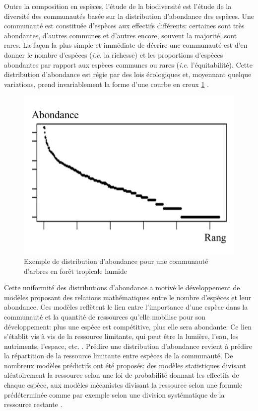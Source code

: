 \documentclass[
  11pt,
  french,
  A4paper,
  extrafontsizes,onecolumn,openright
  ]{memoir}
\begin{document}
Outre la composition en espèces, l'étude de la biodiversité est l'étude
de la diversité des communautés basée sur la distribution d'abondance
des espèces. Une communauté est constituée d'espèces aux effectifs
différents: certaines sont très abondantes, d'autres communes et
d'autres encore, souvent la majorité, sont rares. La façon la plus
simple et immédiate de décrire une communauté est d'en donner le nombre
d'espèces (\emph{i.e.} la richesse) et les proportions d'espèces
abondantes par rapport aux espèces communes ou rares (\emph{i.e.}
l'équitabilité). Cette distribution d'abondance est régie par des lois
écologiques et, moyennant quelque variations, prend invariablement la
forme d'une courbe en creux \ref{fig:AbdDist} \autocite{McGill2007}.

\begin{figure}

{\centering \includegraphics[width=0.6\linewidth]{ExternalFig/SpeciesAbdDist} 

}

\caption{Exemple de distribution d'abondance pour une communauté d'arbres en forêt tropicale humide}\label{fig:AbdDist}
\end{figure}

Cette uniformité des distributions d'abondance a motivé le développement
de modèles proposant des relations mathématiques entre le nombre
d'espèces et leur abondance. Ces modèles reflètent le lien entre
l'importance d'une espèce dans la communauté et la quantité de
ressources qu'elle mobilise pour son développement: plus une espèce est
compétitive, plus elle sera abondante. Ce lien s'établit vis à vis de la
ressource limitante, qui peut être la lumière, l'eau, les nutriments,
l'espace, etc. \autocites{Silvertown2004}{TerSteege2006}. Prédire une
distribution d'abondance revient à prédire la répartition de la
ressource limitante entre espèces de la communauté. De nombreux modèles
prédictifs ont été proposés: des modèles statistiques divisant
aléatoirement la ressource selon une loi de probabilité donnant les
effectifs de chaque espèce, aux modèles mécanistes divisant la ressource
selon une formule prédéterminée comme par exemple selon une division
systématique de la ressource restante
\autocites{Fisher1943}{Motomura1932}{Tokeshi1993}{Magurran1988}.
\end{document}
